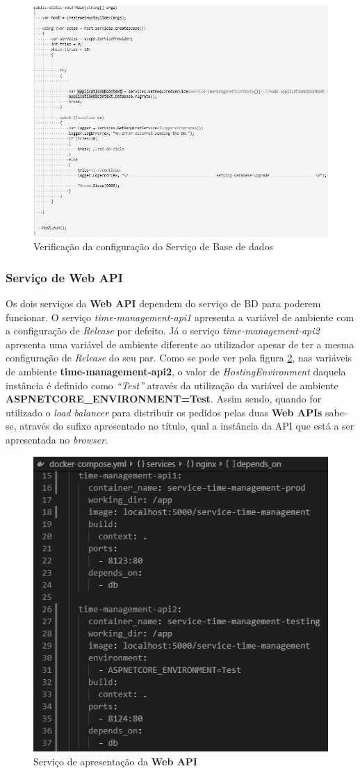 \begin{figure}[hbt!]
\centering
\includegraphics[width=0.9\linewidth]{Cap7/TimeManagementCheckDBService.png}
\caption{Verificação da configuração do Serviço de Base de dados}
\label{Fig:Fig99}
\end{figure}

\subsubsection{Serviço de Web API}

\hspace{1cm}Os dois serviços da \textbf{Web API} dependem do serviço de BD para poderem funcionar. O serviço \textit{time-management-api1} apresenta a variável de ambiente com a configuração de \textit{Release} por defeito. Já o serviço \textit{time-management-api2} apresenta uma variável de ambiente diferente ao utilizador apesar de ter a mesma configuração de \textit{Release} do seu par. Como se pode ver pela figura \ref{Fig:Fig94}, nas variáveis de ambiente \textbf{time-management-api2}, o valor de \textit{HostingEnvironment} daquela instância é definido como \textit{``Test''} através da utilização da variável de ambiente \textbf{ASPNETCORE\_ENVIRONMENT=Test}. Assim sendo, quando for utilizado o \textit{load balancer} para distribuir os pedidos pelas duas \textbf{Web APIs} sabe-se, através do sufixo apresentado no título, qual a instância da API que está a ser apresentada no \textit{browser}. 

\begin{figure}[hbt!]
\centering
\includegraphics[width=0.45\linewidth]{Cap7/TimeManagentDCWebAPI.png}
\caption{Serviço de apresentação da \textbf{Web API}}
\label{Fig:Fig94}
\end{figure}

